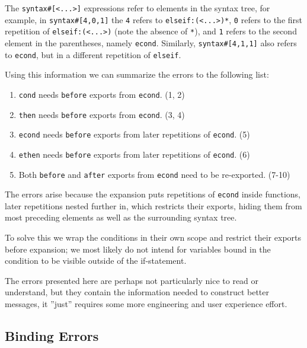 \documentclass{kththesis}
\begin{document}
The \texttt{syntax#[<...>]} expressions refer to elements in the syntax tree, for example, in \texttt{syntax#[4,0,1]} the \texttt{4} refers to \texttt{elseif:(<...>)*}, \texttt{0} refers to the first repetition of \texttt{elseif:(<...>)} (note the absence of \texttt{*}), and \texttt{1} refers to the second element in the parentheses, namely \texttt{econd}. Similarly, \texttt{syntax#[4,1,1]} also refers to \texttt{econd}, but in a different repetition of \texttt{elseif}.

Using this information we can summarize the errors to the following list:

\begin{enumerate}
  \item \texttt{cond} needs \texttt{before} exports from \texttt{econd}. (1, 2)
  \item \texttt{then} needs \texttt{before} exports from \texttt{econd}. (3, 4)
  \item \texttt{econd} needs \texttt{before} exports from later repetitions of \texttt{econd}. (5)
  \item \texttt{ethen} needs \texttt{before} exports from later repetitions of \texttt{econd}. (6)
  \item Both \texttt{before} and \texttt{after} exports from \texttt{econd} need to be re-exported. (7-10)
\end{enumerate}

The errors arise because the expansion puts repetitions of \texttt{econd} inside functions, later repetitions nested further in, which restricts their exports, hiding them from most preceding elements as well as the surrounding syntax tree.

To solve this we wrap the conditions in their own scope and restrict their exports before expansion; we most likely do not intend for variables bound in the condition to be visible outside of the if-statement.

The errors presented here are perhaps not particularly nice to read or understand, but they contain the information needed to construct better messages, it ''just'' requires some more engineering and user experience effort.

\subsection{Binding Errors}
\end{document}
